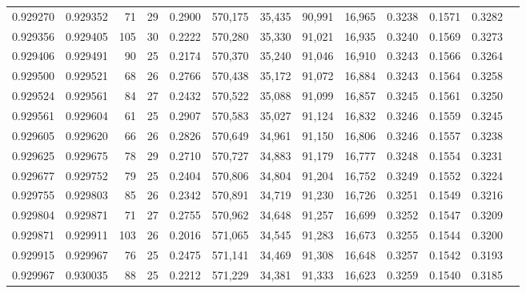 \begin{tabular}{rrrrrrrrrrrrr}
0.929270 & 0.929352 &    71 &  29 &                                     0.2900 & 570,175 &  35,435 &  90,991 &  16,965 & 0.3238 & 0.1571 & 0.3282 \\
0.929356 & 0.929405 &   105 &  30 &                                     0.2222 & 570,280 &  35,330 &  91,021 &  16,935 & 0.3240 & 0.1569 & 0.3273 \\
0.929406 & 0.929491 &    90 &  25 &                                     0.2174 & 570,370 &  35,240 &  91,046 &  16,910 & 0.3243 & 0.1566 & 0.3264 \\
0.929500 & 0.929521 &    68 &  26 &                                     0.2766 & 570,438 &  35,172 &  91,072 &  16,884 & 0.3243 & 0.1564 & 0.3258 \\
0.929524 & 0.929561 &    84 &  27 &                                     0.2432 & 570,522 &  35,088 &  91,099 &  16,857 & 0.3245 & 0.1561 & 0.3250 \\
0.929561 & 0.929604 &    61 &  25 &                                     0.2907 & 570,583 &  35,027 &  91,124 &  16,832 & 0.3246 & 0.1559 & 0.3245 \\
0.929605 & 0.929620 &    66 &  26 &                                     0.2826 & 570,649 &  34,961 &  91,150 &  16,806 & 0.3246 & 0.1557 & 0.3238 \\
0.929625 & 0.929675 &    78 &  29 &                                     0.2710 & 570,727 &  34,883 &  91,179 &  16,777 & 0.3248 & 0.1554 & 0.3231 \\
0.929677 & 0.929752 &    79 &  25 &                                     0.2404 & 570,806 &  34,804 &  91,204 &  16,752 & 0.3249 & 0.1552 & 0.3224 \\
0.929755 & 0.929803 &    85 &  26 &                                     0.2342 & 570,891 &  34,719 &  91,230 &  16,726 & 0.3251 & 0.1549 & 0.3216 \\
0.929804 & 0.929871 &    71 &  27 &                                     0.2755 & 570,962 &  34,648 &  91,257 &  16,699 & 0.3252 & 0.1547 & 0.3209 \\
0.929871 & 0.929911 &   103 &  26 &                                     0.2016 & 571,065 &  34,545 &  91,283 &  16,673 & 0.3255 & 0.1544 & 0.3200 \\
0.929915 & 0.929967 &    76 &  25 &                                     0.2475 & 571,141 &  34,469 &  91,308 &  16,648 & 0.3257 & 0.1542 & 0.3193 \\
0.929967 & 0.930035 &    88 &  25 &                                     0.2212 & 571,229 &  34,381 &  91,333 &  16,623 & 0.3259 & 0.1540 & 0.3185 \\

\end{tabular}
